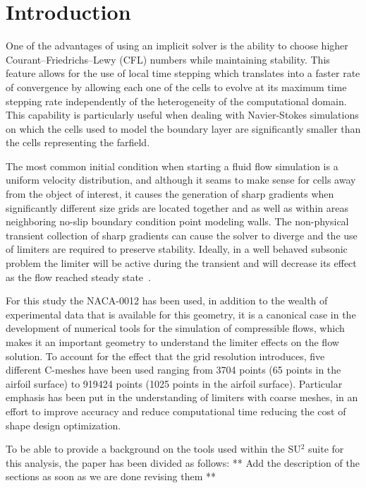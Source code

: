 
\section{Introduction}
One of the advantages of using an implicit solver is the ability to choose higher Courant–Friedrichs–Lewy (CFL) numbers while maintaining stability. This feature allows for the use of local time stepping which translates into a faster rate of convergence by allowing each one of the cells to evolve at its maximum time stepping rate independently of the heterogeneity of the computational domain. This capability is particularly useful when dealing with Navier-Stokes simulations on which the cells used to model the boundary layer are significantly smaller than the cells representing the farfield. 

The most common initial condition when starting a fluid flow simulation is a uniform velocity distribution, and although it seams to make sense for cells away from the object of interest, it causes the generation of sharp gradients when significantly different size grids are located together and as well as within areas neighboring no-slip boundary condition point modeling walls. The non-physical transient collection of sharp gradients can cause the solver to diverge and the use of limiters are required to preserve stability. Ideally, in a well behaved subsonic problem the limiter will be active during the transient and will decrease its effect as the flow reached steady state~\cite{Venkatakrishnan:1993}.

For this study the NACA-0012 has been used, in addition to the wealth of experimental data that is available for this geometry, it is a canonical case in the development of numerical tools for the simulation of compressible flows, which makes it an important geometry to understand the limiter effects on the flow solution. To account for the effect that the grid resolution introduces, five different C-meshes have been used ranging from 3704 points (65 points in the airfoil surface) to 919424 points (1025 points in the airfoil surface). Particular emphasis has been put in the understanding of limiters with coarse meshes, in an effort to improve accuracy and reduce computational time reducing the cost of shape design optimization.

To be able to provide a background on the tools used within the SU$^2$ suite for this analysis, the paper has been divided as follows: ** Add the description of the sections as soon as we are done revising them **